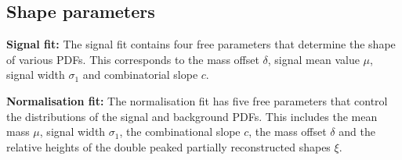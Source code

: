 \subsection{Shape parameters}
\begin{description}
\item \textbf{Signal fit:} The signal fit contains four free parameters that determine the shape of various PDFs. This corresponds to the mass offset $\delta$, signal mean value $\mu$, signal width $\sigma_{1}$ and combinatorial slope $c$.
\item \textbf{Normalisation fit:} The normalisation fit has five free parameters that control the distributions of the signal and background PDFs. This includes the mean \Bp mass $\mu$, signal width $\sigma_{1}$, the combinational slope $c$, the mass offset $\delta$ and the relative heights of the double peaked partially reconstructed shapes $\xi$.   
\end{description}

